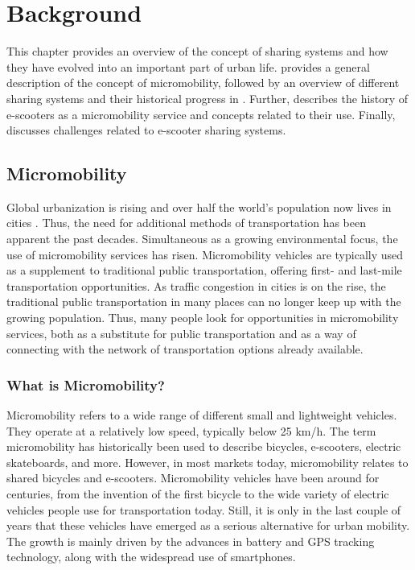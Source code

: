 \chapter{Background}\label{background}
This chapter provides an overview of the concept of sharing systems and how they have evolved into an important part of urban life.  provides a general description of the concept of micromobility, followed by an overview of different sharing systems and their historical progress in . Further,  describes the history of e-scooters as a micromobility service and concepts related to their use. Finally,  discusses challenges related to e-scooter sharing systems. 

\section{Micromobility}\label{micromob}

Global urbanization is rising and over half the world’s population now lives in cities \citep{zarif_small_2019}. Thus, the need for additional methods of transportation has been apparent the past decades. Simultaneous as a growing environmental focus, the use of micromobility services has risen. Micromobility vehicles are typically used as a supplement to traditional public transportation, offering first- and last-mile transportation opportunities. As traffic congestion in cities is on the rise, the traditional public transportation in many places can no longer keep up with the growing population. Thus, many people look for opportunities in micromobility services, both as a substitute for public transportation and as a way of connecting with the network of transportation options already available.

\subsection{What is Micromobility?}
Micromobility refers to a wide range of different small and lightweight vehicles. They operate at a relatively low speed, typically below 25 km/h. The term micromobility has historically been used to describe bicycles, e-scooters, electric skateboards, and more. However, in most markets today, micromobility relates to shared bicycles and e-scooters. Micromobility vehicles have been around for centuries, from the invention of the first bicycle to the wide variety of electric vehicles people use for transportation today. Still, it is only in the last couple of years that these vehicles have emerged as a serious alternative for urban mobility. The growth is mainly driven by the advances in battery and GPS tracking technology, along with the widespread use of smartphones. 

